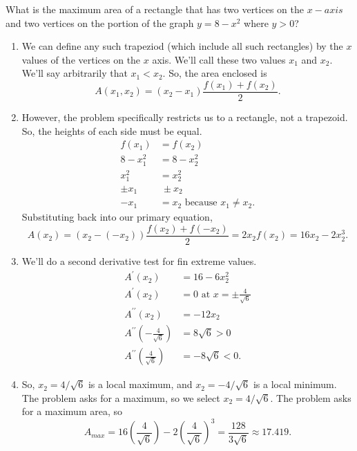 \begin{example}
	What is the maximum area of a rectangle that has two vertices on the $x-axis$ and two vertices on the portion of the graph $y=8-x^2$ where $y > 0$?
\end{example}
\begin{answer}
	\begin{enumerate}
		\item We can define any such trapeziod (which include all such rectangles) by the $x$ values of the vertices on the $x$ axis.
			We'll call these two values $x_1$ and $x_2$.
			We'll say arbitrarily that $x_1 < x_2$.
			So, the area enclosed is
			\begin{equation*}
				A(x_1, x_2) = (x_2 - x_1)\frac{f(x_1) + f(x_2)}{2}.
			\end{equation*}
		\item However, the problem specifically restricts us to a rectangle, not a trapezoid.
			So, the heights of each side must be equal.
			\begin{align*}
				f(x_1) &= f(x_2) \\
				8 - x_1^2 &= 8 - x_2^2 \\
				x_1^2 &= x_2^2 \\
				\pm x_1 &\ \pm x_2 \\
				-x_1 &= x_2 \text{ because $x_1 \neq x_2$}.
			\end{align*}
			Substituting back into our primary equation,
			\begin{equation*}
				A(x_2) = (x_2 - (-x_2))\frac{f(x_2) + f(-x_2)}{2} = 2x_2f(x_2) = 16x_2 - 2x_2^3.
			\end{equation*}
		\item We'll do a second derivative test for fin extreme values.
			\begin{align*}
				A^\prime(x_2) &= 16 - 6x_2^2 \\
				A^\prime(x_2) &= 0 \text{ at } x = \pm\frac{4}{\sqrt{6}} \\
				A^{\prime\prime}(x_2) &= -12x_2 \\
				A^{\prime\prime}\left(-\frac{4}{\sqrt{6}}\right) &= 8\sqrt{6} > 0 \\
				A^{\prime\prime}\left(\frac{4}{\sqrt{6}}\right) &= -8\sqrt{6} < 0.
			\end{align*}
		\item So, $x_2 = 4/\sqrt{6}$ is a local maximum, and $x_2 = -4/\sqrt{6}$ is a local minimum.
			The problem asks for a maximum, so we select $x_2 = 4/\sqrt{6}$.
			The problem asks for a maximum area, so
			\begin{equation*}
				A_{max} = 16\left(\frac{4}{\sqrt{6}}\right) - 2\left(\frac{4}{\sqrt{6}}\right)^3 = \frac{128}{3\sqrt{6}} \approx 17.419.
			\end{equation*}
	\end{enumerate}
\end{answer}